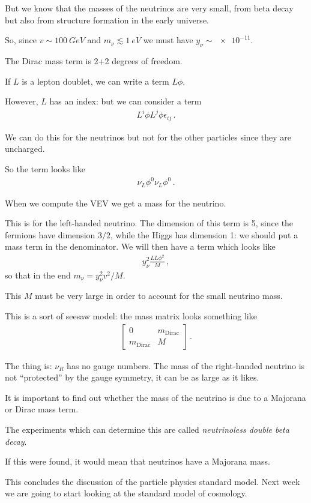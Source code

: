 \documentclass[main.tex]{subfiles}
\begin{document}
But we know that the masses of the neutrinos are very small, from beta decay but also from structure formation in the early universe.

So, since \(v \sim \SI{100}{GeV}\) and \(m_{\nu } \lesssim \SI{1}{eV}\) we must have \(y_{\nu } \sim \num{e-11}\).

The Dirac mass term is 2+2 degrees of freedom. 

If \(L\) is a lepton doublet, we can write a term \(L \phi \).

However, \(L\) has an index: but we can consider a term 
%
\begin{align}
L^{i} \phi L^{j} \phi \epsilon_{ij}
\,.
\end{align}

We can do this for the neutrinos but not for the other particles since they are uncharged. 

So the term looks like 
%
\begin{align}
\nu_{L} \phi^{0} \nu_{L} \phi^{0}
\,.
\end{align}

When we compute the VEV we get a mass for the neutrino. 

This is for the left-handed neutrino. The dimension of this term is 5, since the fermions have dimension \(3/2\), while the Higgs has dimension 1: we should put a mass term in the denominator.
We will then have a term which looks like 
%
\begin{align}
y^2_{\nu } \frac{L L \phi^2}{M}
\,,
\end{align}
%
so that in the end \(m_{\nu } = y^2_{\nu } v^2 / M\).

This \(M\) must be very large in order to account for the small neutrino mass.

This is a sort of seesaw model: the mass matrix looks something like 
%
\begin{subequations}
\begin{align}
\left[\begin{array}{cc}
0 & m _{\text{Dirac}} \\ 
m _{\text{Dirac}} & M
\end{array}\right]
\,.
\end{align}
\end{subequations}

The thing is: \(\nu_{R}\) has no gauge numbers. 
The mass of the right-handed neutrino is not ``protected'' by the gauge symmetry, it can be as large as it likes. 


It is important to find out whether the mass of the neutrino is due to a Majorana or Dirac mass term.

The experiments which can determine this are called \emph{neutrinoless double beta decay}.

If this were found, it would mean that neutrinos have a Majorana mass.

This concludes the discussion of the particle physics standard model. Next week we are going to start looking at the standard model of cosmology.
\end{document}
